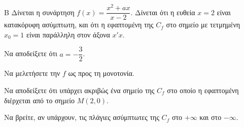 \begin{thema}{Β}
Δίνεται η συνάρτηση $f(x) = \dfrac{x^2+a x}{x-2}$. Δίνεται ότι η ευθεία $x=2$ είναι κατακόρυφη ασύμπτωτη, και ότι η εφαπτομένη της $C_f$ στο σημείο με τετμημένη $x_0=1$ είναι παράλληλη στον άξονα $x'x$.
\begin{erwthma}
  \item Να αποδείξετε ότι $a=-\dfrac{3}{2}$.
  \item Να μελετήσετε την $f$ ως προς τη μονοτονία.
  \item Να αποδείξετε ότι υπάρχει ακριβώς ένα σημείο της $C_f$ στο οποίο η εφαπτομένη διέρχεται από το σημείο $M(2, 0)$.
  \item Να βρείτε, αν υπάρχουν, τις πλάγιες ασύμπτωτες της $C_f$ στο $+\infty$ και στο $-\infty$.
\end{erwthma}
\end{thema}
